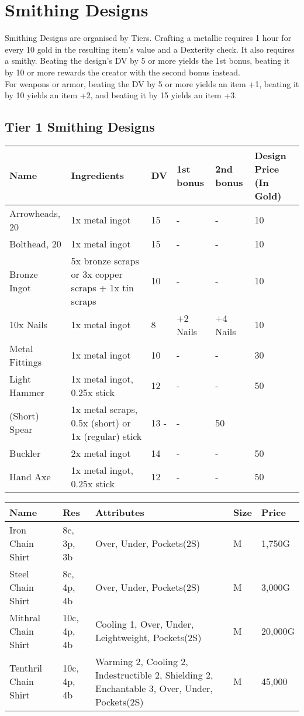 \section{Smithing Designs}\label{sec:smithingDesigns}
Smithing Designs are organised by Tiers.
Crafting a metallic requires 1 hour for every 10 gold in the resulting item's value and a Dexterity check.
It also requires a smithy.
Beating the design's DV by 5 or more yields the 1st bonus, beating it by 10 or more rewards the creator with the second bonus instead.\\
For weapons or armor, beating the DV by 5 or more yields an item +1, beating it by 10 yields an item +2, and beating it by 15 yields an item +3.\\

\subsection{Tier 1 Smithing Designs}
\begin{longtable}{p{1.5cm} | p{2.5cm} | l | p{2cm} | p{2cm} | p{1cm} }
	Name & Ingredients & DV & 1st bonus & 2nd bonus & Design Price (In Gold)\\ \hline
	Arrowheads, 20 & 1x metal ingot & 15 & - & - & 10\\
	Bolthead, 20 & 1x metal ingot & 15 & - & - & 10\\
	Bronze Ingot & 5x bronze scraps or 3x copper scraps + 1x tin scraps & 10 & - & - & 10\\
	10x Nails & 1x metal ingot & 8 & +2 Nails & +4 Nails & 10\\
	Metal Fittings & 1x metal ingot & 10 & - & - & 30\\
	Light Hammer & 1x metal ingot, 0.25x stick & 12 & - & - & 50\\
	(Short) Spear & 1x metal scraps, 0.5x (short) or 1x (regular) stick & 13 - & - & 50\\
	Buckler & 2x metal ingot & 14 & - & - & 50\\
	Hand Axe & 1x metal ingot, 0.25x stick & 12 & - & - & 50\\
\end{longtable}

\begin{longtable}{p{3.5cm} | p{1.5cm} | p{5cm} | p{1cm} | p{1.25cm}}
	Name & Res &  Attributes & Size & Price\\ \hline
	Iron Chain Shirt & 8c, 3p, 3b & Over, Under, Pockets(2S) & M & 1,750G\\

	Steel Chain Shirt & 8c, 4p, 4b & Over, Under, Pockets(2S) & M & 3,000G\\

	Mithral Chain Shirt & 10c, 4p, 4b & Cooling 1, Over, Under, Leightweight, Pockets(2S) & M & 20,000G\\

	Tenthril Chain Shirt & 10c, 4p, 4b & Warming 2, Cooling 2, Indestructible 2, Shielding 2, Enchantable 3, Over, Under, Pockets(2S) & M & 45,000\\
\end{longtable}


